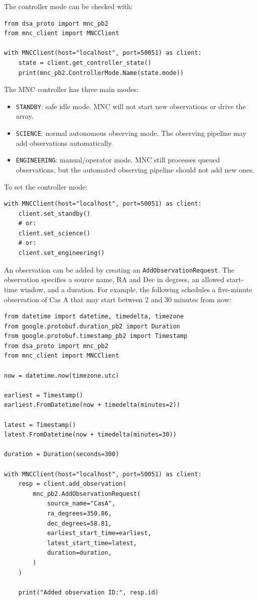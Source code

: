 \documentclass[12pt]{extarticle}
\begin{document}
The controller mode can be checked with:

\begin{lstlisting}
from dsa_proto import mnc_pb2
from mnc_client import MNCClient

with MNCClient(host="localhost", port=50051) as client:
    state = client.get_controller_state()
    print(mnc_pb2.ControllerMode.Name(state.mode))
\end{lstlisting}

The MNC controller has three main modes:

\begin{itemize}
    \item \texttt{STANDBY}: safe idle mode. MNC will not start new observations or drive the array.
    \item \texttt{SCIENCE}: normal autonomous observing mode. The observing pipeline may add observations automatically.
    \item \texttt{ENGINEERING}: manual/operator mode. MNC still processes queued observations, but the automated observing pipeline should not add new ones.
\end{itemize}

To set the controller mode:

\begin{lstlisting}
with MNCClient(host="localhost", port=50051) as client:
    client.set_standby()
    # or:
    client.set_science()
    # or:
    client.set_engineering()
\end{lstlisting}

An observation can be added by creating an \texttt{AddObservationRequest}. The observation specifies a source name, RA and Dec in degrees, an allowed start-time window, and a duration. For example, the following schedules a five-minute observation of Cas A that may start between 2 and 30 minutes from now:

\begin{lstlisting}
from datetime import datetime, timedelta, timezone
from google.protobuf.duration_pb2 import Duration
from google.protobuf.timestamp_pb2 import Timestamp
from dsa_proto import mnc_pb2
from mnc_client import MNCClient

now = datetime.now(timezone.utc)

earliest = Timestamp()
earliest.FromDatetime(now + timedelta(minutes=2))

latest = Timestamp()
latest.FromDatetime(now + timedelta(minutes=30))

duration = Duration(seconds=300)

with MNCClient(host="localhost", port=50051) as client:
    resp = client.add_observation(
        mnc_pb2.AddObservationRequest(
            source_name="CasA",
            ra_degrees=350.86,
            dec_degrees=58.81,
            earliest_start_time=earliest,
            latest_start_time=latest,
            duration=duration,
        )
    )

    print("Added observation ID:", resp.id)
\end{lstlisting}
\end{document}
